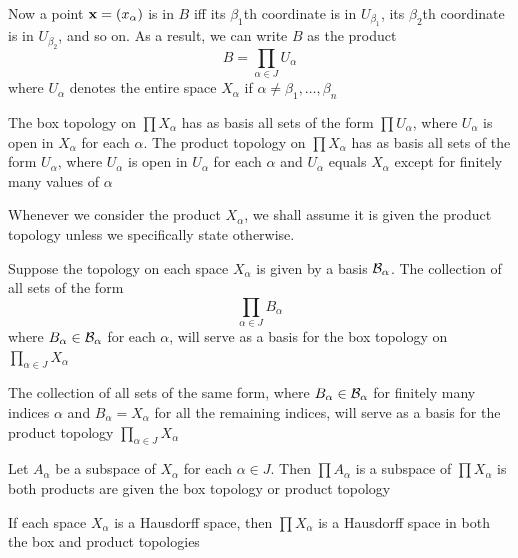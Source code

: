 \documentclass[11pt]{article}
\begin{document}
Now a point \(\operatorname{\textbf{x}}=(x_\alpha)\) is in \(B\) iff its \(\beta_1\)th coordinate is in \(U_{\beta_1}\),  its \(\beta_2\)th
coordinate is in \(U_{\beta_2}\), and so on. As a result, we can write \(B\) as the product
\begin{equation*}
B=\prod_{\alpha\in J}U_\alpha
\end{equation*}
where \(U_\alpha\) denotes the entire space \(X_\alpha\) if \(\alpha\neq\beta_1,\dots,\beta_n\)

\begin{theorem}
The box topology on \(\prod X_\alpha\) has as basis all sets of the form \(\prod U_\alpha\), where \(U_\alpha\) is open
in \(X_\alpha\) for each \(\alpha\). The product topology on \(\prod X_\alpha\) has as basis all sets of the
form \(U_\alpha\), where \(U_\alpha\) is open in \(U_\alpha\) for  each \(\alpha\) and \(U_\alpha\) equals \(X_\alpha\) except
for finitely many values of \(\alpha\)
\end{theorem}

\begin{quoting}
Whenever we consider the product \(X_\alpha\), we shall assume it is given the product topology unless
we specifically state otherwise.
\end{quoting}

\begin{theorem}[]
\label{thm19.2}
Suppose the topology on each space \(X_\alpha\) is given by a basis \(\mathcal{B}_\alpha\). The collection of all
sets of the form
\begin{equation*}
\prod_{\alpha\in J}B_\alpha
\end{equation*}
where \(B_\alpha\in \mathcal{B}_\alpha\) for each \(\alpha\), will serve as a basis for the box topology on \(\prod_{\alpha\in J}X_\alpha\)

The collection of all sets of the same form, where \(B_\alpha\in\mathcal{B}_\alpha\) for finitely many indices \(\alpha\)
and \(B_\alpha=X_\alpha\) for all the remaining indices, will serve as a basis for the product
topology \(\prod_{\alpha\in J}X_\alpha\)
\end{theorem}

\begin{theorem}[]
\label{thm19.3}
Let \(A_\alpha\) be a subspace of \(X_\alpha\) for each \(\alpha\in J\). Then \(\prod A_\alpha\) is a subspace of \(\prod X_\alpha\)
is both products are given the box topology or product topology
\end{theorem}

\begin{theorem}[]
\label{thm19.4}
If each space \(X_\alpha\) is a Hausdorff space, then \(\prod X_\alpha\) is a Hausdorff space in both the box
and product topologies
\end{theorem}
\end{document}
